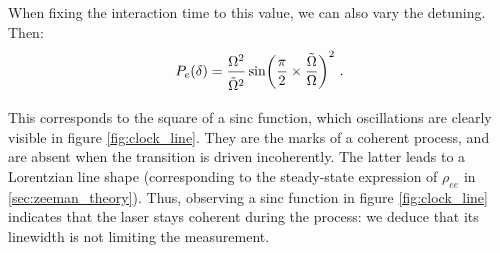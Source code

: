 \documentclass[11pt]{article}
\numberwithin{equation}{section}
\numberwithin{figure}{section}
\begin{document}
When fixing the interaction time to this value, we can also vary the detuning. Then:
%
\begin{equation}
	\label{eq:rabi_sinc}
	P_e(\delta) = \frac{\Omega^2}{\vphantom{\Big(}\tilde{\Omega}^2} \sin(\frac{\pi}{2} \times \frac{\tilde{\Omega}}{\Omega})^2~.
\end{equation}
%
This corresponds to the square of a sinc function, which oscillations are clearly visible in figure \ref{fig:clock_line}. They are the marks of a coherent process, and are absent when the transition is driven incoherently. The latter leads to a Lorentzian line shape (corresponding to the steady-state expression of $\rho_{ee}$ in \ref{sec:zeeman_theory}). Thus, observing a sinc function in figure \ref{fig:clock_line} indicates that the laser stays coherent during the process: we deduce that its linewidth is not limiting the measurement.

\newpage



\end{document}

